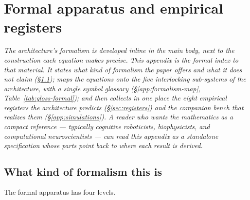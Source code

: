 \documentclass{article}
\begin{document}
\appendix
\renewcommand{\thesection}{Appendix \arabic{section}}
\renewcommand{\thesubsection}{\arabic{subsection}}
\renewcommand{\thesubsubsection}{\thesubsection.\arabic{subsubsection}}
\setcounter{section}{0}

\section{Formal apparatus and empirical registers}\label{app:formalism}

\noindent\emph{The architecture's formalism is developed inline in the
main body, next to the construction each equation makes precise.  This
appendix is the formal \emph{index} to that material.  It states what
kind of formalism the paper offers and what it does not claim
(\S\ref{app:formalism-kind}); maps the equations onto the five
interlocking sub-systems of the architecture, with a single symbol
glossary (\S\ref{app:formalism-map}, Table~\ref{tab:gloss-formal}); and
then collects in one place the eight empirical registers the architecture
predicts (\S\ref{sec:registers}) and the companion bench that realizes
them (\S\ref{app:simulations}).  A reader who wants the mathematics as a
compact reference --- typically cognitive roboticists, biophysicists, and
computational neuroscientists --- can read this appendix as a standalone
specification whose parts point back to where each result is derived.}

\subsection{What kind of formalism this is}\label{app:formalism-kind}

The formal apparatus has four levels.
\end{document}
